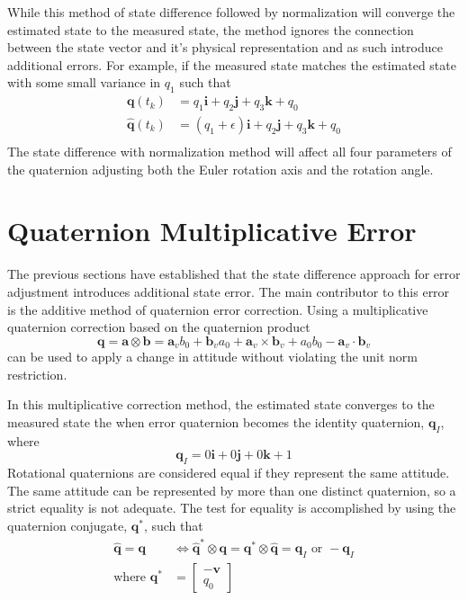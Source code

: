 \documentclass[]{aiaa-tc}%
\newcommand{\bs}[1]{\boldsymbol{#1}}
\begin{document}
While this method of state difference followed by normalization will converge the estimated state to the measured state, the method ignores the connection between the state vector and it's physical representation and as such introduce additional errors.  For example, if the measured state matches the estimated state with some small variance in $q_1$ such that
\begin{equation}
  \begin{aligned}
    \bs{q}(t_{k}) &= q_1 \bs{i} + q_2 \bs{j} + q_3 \bs{k} + q_0 \\
    \bs{\hat{q}}(t_{k}) &= (q_1 + \epsilon) \bs{i} + q_2 \bs{j} + q_3 \bs{k} + q_0 \\
  \end{aligned}
\end{equation}
The state difference with normalization method will affect all four parameters of the quaternion adjusting both the Euler rotation axis and the rotation angle.

\section{Quaternion Multiplicative Error}
\label{sec:QuaternionMultiplicativeError}

The previous sections have established that the state difference approach for error adjustment introduces additional state error.  The main contributor to this error is the additive method of quaternion error correction.  Using a multiplicative quaternion correction based on the quaternion product
\begin{equation}
  \bs{q} = \bs{a} \otimes \bs{b} = \bs{a}_v b_0 + \bs{b}_v a_0 + \bs{a}_v \times \bs{b}_v + a_0 b_0 - \bs{a}_v \cdot \bs{b}_v
  \label{eqn:QuaternionMultiplication}
\end{equation}
can be used to apply a change in attitude without violating the unit norm restriction.

In this multiplicative correction method, the estimated state converges to the measured state the when error quaternion becomes the identity quaternion, $\bs{q}_I$, where
\begin{equation}
  \bs{q}_I = 0 \bs{i} + 0 \bs{j} + 0 \bs{k} + 1
\end{equation}
Rotational quaternions are considered equal if they represent the same attitude.  The same attitude can be represented by more than one distinct quaternion, so a strict equality is not adequate.  The test for equality is accomplished by using the quaternion conjugate, $\bs{q}^*$, such that
\begin{subequations}
  \begin{align}
    \bs{\hat{q}} = \bs{q} & \iff \bs{\hat{q}}^* \otimes \bs{q} = \bs{q}^* \otimes \bs{\hat{q}} = \bs{q}_I \text{ or } -\bs{q}_I \\
    \text{where } \bs{q}^* &= \begin{bmatrix} -\bs{v} \\ q_0 \end{bmatrix}
  \end{align}
  \label{eqn:QuaternionEquality}
\end{subequations}
\end{document}
